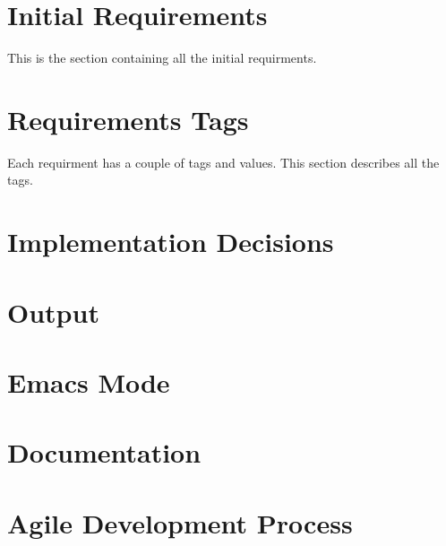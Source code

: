 \documentclass{article}
\begin{document}
\section{Initial Requirements}
This is the section containing all the initial requirments.









\section{Requirements Tags}
Each requirment has a couple of tags and values.  This section
describes all the tags.











\section{Implementation Decisions}




\section{Output}






\section{Emacs Mode}







\section{Documentation}




\section{Agile Development Process}


\end{document}
